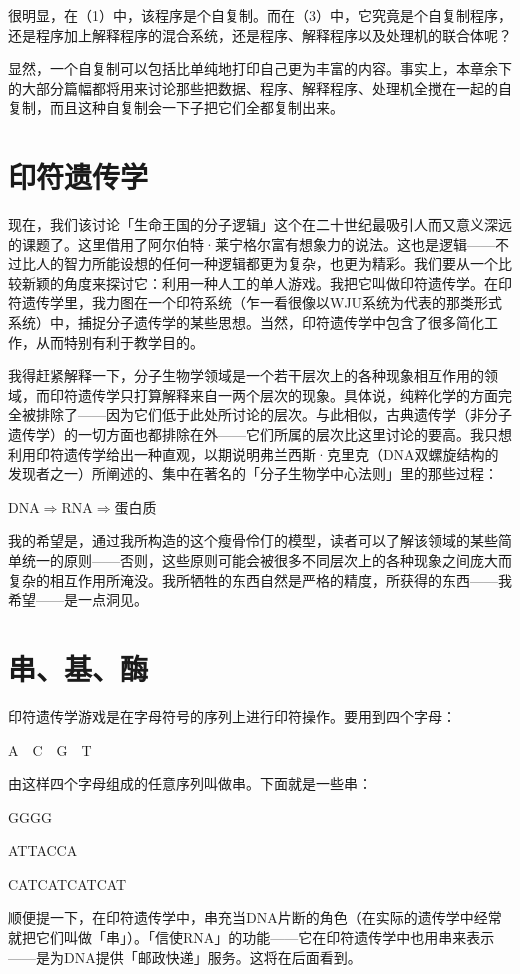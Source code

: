 \documentclass[
  12pt,
  twoside,
  openright,
  oldfontcommands,
]{memoir}
\begin{document}
很明显，在（1）中，该程序是个自复制。而在（3）中，它究竟是个自复制程序，还是程序加上解释程序的混合系统，还是程序、解释程序以及处理机的联合体呢？

显然，一个自复制可以包括比单纯地打印自己更为丰富的内容。事实上，本章余下的大部分篇幅都将用来讨论那些把数据、程序、解释程序、处理机全搅在一起的自复制，而且这种自复制会一下子把它们全都复制出来。

\section{印符遗传学}

现在，我们该讨论「生命王国的分子逻辑」这个在二十世纪最吸引人而又意义深远的课题了。这里借用了阿尔伯特·莱宁格尔富有想象力的说法。这也是逻辑------不过比人的智力所能设想的任何一种逻辑都更为复杂，也更为精彩。我们要从一个比较新颖的角度来探讨它：利用一种人工的单人游戏。我把它叫做印符遗传学。在印符遗传学里，我力图在一个印符系统（乍一看很像以WJU系统为代表的那类形式系统）中，捕捉分子遗传学的某些思想。当然，印符遗传学中包含了很多简化工作，从而特别有利于教学目的。

我得赶紧解释一下，分子生物学领域是一个若干层次上的各种现象相互作用的领域，而印符遗传学只打算解释来自一两个层次的现象。具体说，纯粹化学的方面完全被排除了------因为它们低于此处所讨论的层次。与此相似，古典遗传学（非分子遗传学）的一切方面也都排除在外------它们所属的层次比这里讨论的要高。我只想利用印符遗传学给出一种直观，以期说明弗兰西斯·克里克（DNA双螺旋结构的发现者之一）所阐述的、集中在著名的「分子生物学中心法则」里的那些过程：

DNA$\Rightarrow$RNA$\Rightarrow$蛋白质

我的希望是，通过我所构造的这个瘦骨伶仃的模型，读者可以了解该领域的某些简单统一的原则------否则，这些原则可能会被很多不同层次上的各种现象之间庞大而复杂的相互作用所淹没。我所牺牲的东西自然是严格的精度，所获得的东西------我希望------是一点洞见。

\section{串、基、酶}

印符遗传学游戏是在字母符号的序列上进行印符操作。要用到四个字母：

A　C　G　T

由这样四个字母组成的任意序列叫做串。下面就是一些串：

GGGG

ATTACCA

CATCATCATCAT

顺便提一下，在印符遗传学中，串充当DNA片断的角色（在实际的遗传学中经常就把它们叫做「串」）。「信使RNA」的功能------它在印符遗传学中也用串来表示------是为DNA提供「邮政快递」服务。这将在后面看到。
\end{document}
